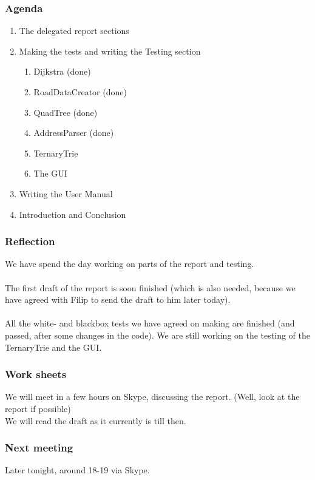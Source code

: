 \subsubsection*{Agenda}
\begin{enumerate}
	\item The delegated report sections
	\item Making the tests and writing the Testing section
	\begin{enumerate}
		\item Dijkstra (done)
		\item RoadDataCreator (done)
		\item QuadTree (done)
		\item AddressParser (done)
		\item TernaryTrie
		\item The GUI
	\end{enumerate}
	\item Writing the User Manual
	\item Introduction and Conclusion
\end{enumerate}

\subsubsection*{Reflection}
We have spend the day working on parts of the report and testing. \\ \\
The first draft of the report is soon finished (which is also needed, because we have agreed with Filip to send the draft to him later today). \\ \\
All the white- and blackbox tests we have agreed on making are finished (and passed, after some changes in the code).
We are still working on the testing of the TernaryTrie and the GUI.
\subsubsection*{Work sheets}
We will meet in a few hours on Skype, discussing the report. (Well, look at the report if possible) \\
We will read the draft as it currently is till then.

\subsubsection*{Next meeting}
Later tonight, around 18-19 via Skype.